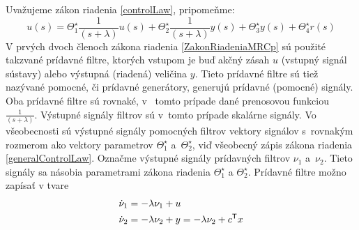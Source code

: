 \documentclass[a4paper, 10pt, ]{article}
\begin{document}
Uvažujeme zákon riadenia \eqref{controlLaw}, pripomeňme:
\begin{equation} \label{ZakonRiadeniaMRCp}
	u(s) = \Theta_1^\star \frac{1}{(s + \lambda)} u(s) + \Theta_2^\star \frac{1}{(s + \lambda)} y(s) + \Theta_3^\star y(s) + \Theta_4^\star r(s)
\end{equation}
V prvých dvoch členoch zákona riadenia \eqref{ZakonRiadeniaMRCp} sú použité takzvané prídavné filtre, ktorých vstupom je buď akčný zásah $u$ (vstupný signál sústavy) alebo výstupná (riadená) veličina $y$. Tieto prídavné filtre sú tiež nazývané pomocné, či prídavné generátory, generujú prídavné (pomocné) signály. Oba prídavné filtre sú rovnaké, v~ tomto prípade dané prenosovou funkciou $\frac{1}{(s + \lambda)}$. Výstupné signály filtrov sú v~tomto prípade skalárne signály. Vo všeobecnosti sú výstupné signály pomocných filtrov vektory signálov s~rovnakým rozmerom ako vektory parametrov $\Theta_1^\star$ a~$\Theta_2^\star$, viď všeobecný zápis zákona riadenia \eqref{generalControlLaw}. Označme výstupné signály prídavných filtrov $\nu_1$ a~$\nu_2$. Tieto signály sa násobia parametrami zákona riadenia ${{\Theta}_1^\star}$ a ${{\Theta}_2^\star}$. Prídavné filtre možno zapísať v tvare
\begin{subequations}
	\begin{align}
		 \dot \nu_1 &= -\lambda \nu_1 + u \\
		 \dot \nu_2 &= -\lambda \nu_2 + y = -\lambda \nu_2 + c^{\mathsf{T}} x
	\end{align}
\end{subequations}
\end{document}

